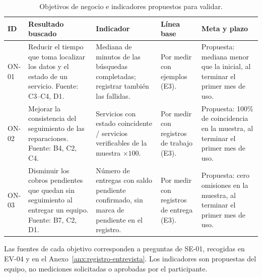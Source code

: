 \begin{table}[H]
  \centering
  \caption{Objetivos de negocio e indicadores propuestos para validar.}
  \label{tab:objetivos}
  \small
  \renewcommand{\arraystretch}{1.25}
  \noindent\begin{tabularx}{\linewidth}{@{}L{1.1cm}YL{2.6cm}L{2.4cm}L{2.4cm}@{}}
    \toprule
    \textbf{ID} & \textbf{Resultado buscado} & \textbf{Indicador} & \textbf{L\'inea base} & \textbf{Meta y plazo} \\
    \midrule
    ON-01 & Reducir el tiempo que toma localizar los datos y el estado de un servicio. Fuente: C3--C4, D1. & Mediana de minutos de las búsquedas completadas; registrar también las fallidas. & Por medir con ejemplos (E3). & Propuesta: mediana menor que la inicial, al terminar el primer mes de uso. \\
    ON-02 & Mejorar la consistencia del seguimiento de las reparaciones. Fuente: B4, C2, C4. & Servicios con estado coincidente / servicios verificables de la muestra $\times 100$. & Por medir con registros de trabajo (E3). & Propuesta: 100\% de coincidencia en la muestra, al terminar el primer mes de uso. \\
    ON-03 & Disminuir los cobros pendientes que quedan sin seguimiento al entregar un equipo. Fuente: B7, C2, D1. & Número de entregas con saldo pendiente confirmado, sin marca de pendiente en el registro. & Por medir con registros de entrega (E3). & Propuesta: cero omisiones en la muestra, al terminar el primer mes de uso. \\
    \bottomrule
  \end{tabularx}
  \normalsize
\end{table}

Las fuentes de cada objetivo corresponden a preguntas de SE-01, recogidas en EV-04 y en el
Anexo~\ref{anx:registro-entrevista}. Los indicadores son propuestas del equipo, no mediciones
solicitadas o aprobadas por el participante.


